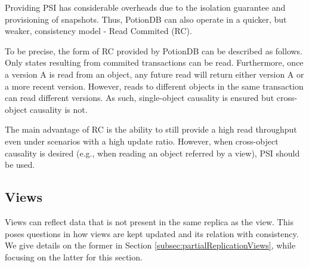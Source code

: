 \documentclass{vldb}
\newcommand{\grumbler}[2]{{\color{red}{\bf #1:} #2}}
\renewcommand{\grumbler}[2]{}
\newcommand{\andre}[1]{\grumbler{andre}{#1}}
\begin{document}

Providing PSI has considerable overheads due to the isolation guarantee \cite{sovran2011transactional} and provisioning of snapshots.
Thus, PotionDB can also operate in a quicker, but weaker, consistency model - Read Commited (RC).

To be precise, the form of RC provided by PotionDB can be described as follows.
Only states resulting from commited transactions can be read.
Furthermore, once a version A is read from an object, any future read will return either version A or a more recent version.
However, reads to different objects in the same transaction can read different versions.
As such, single-object causality is ensured but cross-object causality is not.

The main advantage of RC is the ability to still provide a high read throughput even under scenarios with a high update ratio.
However, when cross-object causality is desired (e.g., when reading an object referred by a view), PSI should be used.



\subsection{Views}

Views can reflect data that is not present in the same replica as the view.
This poses questions in how views are kept updated and its relation with consistency.
We give details on the former in Section \ref{subsec:partialReplicationViews}, while focusing on the latter for this section.
\end{document}
